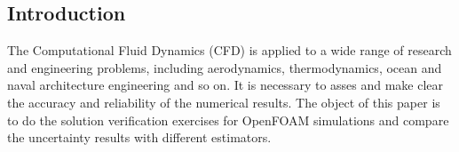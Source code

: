 \documentclass{cfdsc}
\begin{document}
\begin{multicols}{2}




%

\section{Introduction}
The Computational Fluid Dynamics (CFD) is applied to a wide range of research and engineering problems, including aerodynamics, thermodynamics, ocean and naval architecture engineering and so on. It is necessary to asses and make clear the accuracy and reliability of the numerical results. The object of this paper is to do the solution verification exercises for OpenFOAM simulations and compare the uncertainty results with different estimators.


\end{multicols}
\end{document}
